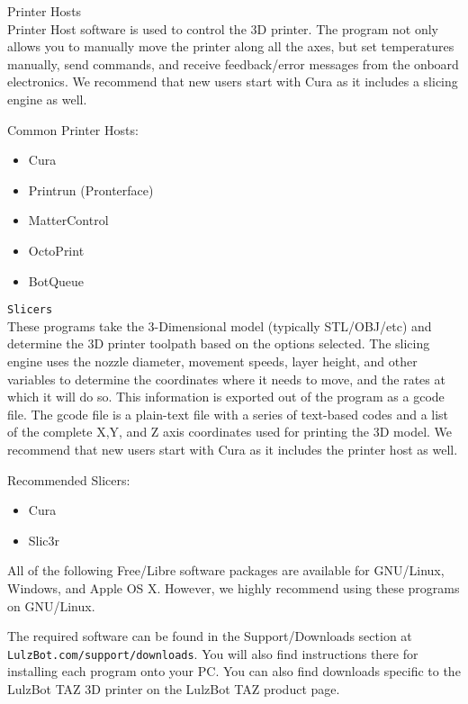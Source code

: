 \begin{description}
\item{Printer Hosts} \hfill \\
Printer Host software is used to control the 3D printer. The program not only allows you to manually move the printer along all the axes, but set temperatures manually, send commands, and receive feedback/error messages from the onboard electronics. We recommend that new users start with Cura as it includes a slicing engine as well.

Common Printer Hosts:
\begin{itemize}
\item Cura
\item Printrun (Pronterface)
\item MatterControl
\item OctoPrint
\item BotQueue
\end{itemize}

\item{\texttt{Slicers}} \hfill \\
These programs take the 3-Dimensional model (typically STL/OBJ/etc) and determine the 3D printer toolpath based on the options selected. The slicing engine uses the nozzle diameter, movement speeds, layer height, and other variables to determine the coordinates where it needs to move, and the rates at which it will do so. This information is exported out of the program as a gcode file. The gcode file is a plain-text file with a series of text-based codes and a list of the complete X,Y, and Z axis coordinates used for printing the 3D model. We recommend that new users start with Cura as it includes the printer host as well.

Recommended Slicers:
\begin{itemize}
\item Cura
\item Slic3r
\end{itemize}

\end{description}

All of the following Free/Libre software packages are available for GNU/Linux, Windows, and Apple OS X. However, we highly recommend using these programs on GNU/Linux.

The required software can be found in the Support/Downloads section at \texttt{LulzBot.com/support/downloads}. You will also find instructions there for installing each program onto your PC. You can also find downloads specific to the LulzBot\textsuperscript{\miniscule{\texttrademark}} TAZ 3D printer on the LulzBot\textsuperscript{\miniscule{\texttrademark}} TAZ product page.

